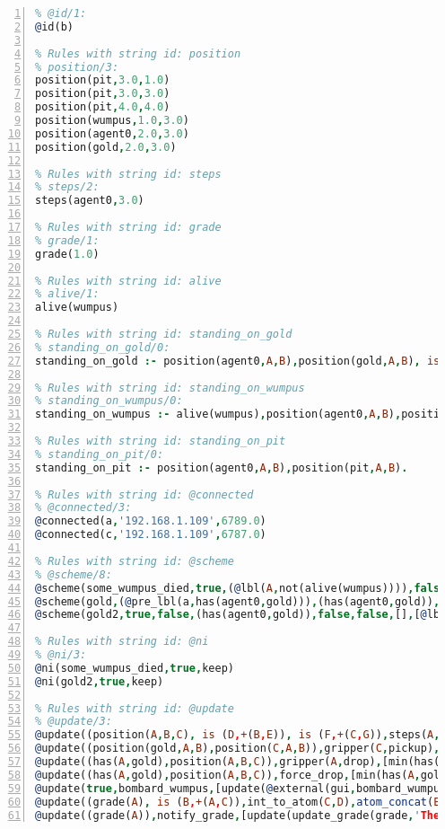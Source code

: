 \documentclass[11pt]{article}\usepackage[utf8]{inputenc}\usepackage{geometry}
\begin{document}
\lstset{breaklines=true}\begin{lstlisting}[language=Prolog, numbers=left]
% Rules with string id: @id
% @id/1:
@id(b)

% Rules with string id: position
% position/3:
position(pit,3.0,1.0)
position(pit,3.0,3.0)
position(pit,4.0,4.0)
position(wumpus,1.0,3.0)
position(agent0,2.0,3.0)
position(gold,2.0,3.0)

% Rules with string id: steps
% steps/2:
steps(agent0,3.0)

% Rules with string id: grade
% grade/1:
grade(1.0)

% Rules with string id: alive
% alive/1:
alive(wumpus)

% Rules with string id: standing_on_gold
% standing_on_gold/0:
standing_on_gold :- position(agent0,A,B),position(gold,A,B), is (C,+(A,B)),>(C,2.0).

% Rules with string id: standing_on_wumpus
% standing_on_wumpus/0:
standing_on_wumpus :- alive(wumpus),position(agent0,A,B),position(wumpus,A,B).

% Rules with string id: standing_on_pit
% standing_on_pit/0:
standing_on_pit :- position(agent0,A,B),position(pit,A,B).

% Rules with string id: @connected
% @connected/3:
@connected(a,'192.168.1.109',6789.0)
@connected(c,'192.168.1.109',6787.0)

% Rules with string id: @scheme
% @scheme/8:
@scheme(some_wumpus_died,true,(@lbl(A,not(alive(wumpus)))),false,false,false,[update(bombard_wumpus)|[]],[])
@scheme(gold,(@pre_lbl(a,has(agent0,gold))),(has(agent0,gold)),false,(@lbl(a,not(has(agent0,gold)))),false,[update(force_drop)|[]],[])
@scheme(gold2,true,false,(has(agent0,gold)),false,false,[],[@lbl(c,update(bombard_wumpus))|[]])

% Rules with string id: @ni
% @ni/3:
@ni(some_wumpus_died,true,keep)
@ni(gold2,true,keep)

% Rules with string id: @update
% @update/3:
@update((position(A,B,C), is (D,+(B,E)), is (F,+(C,G)),steps(A,H), is (I,+(H,1.0))),move(A,E,G),[min(position(A,B,C)),plus(position(A,D,F)),min(steps(A,H)),plus(steps(A,I))|[]])
@update((position(gold,A,B),position(C,A,B)),gripper(C,pickup),[plus(has(C,gold)),min(position(gold,A,B))|[]])
@update((has(A,gold),position(A,B,C)),gripper(A,drop),[min(has(A,gold)),plus(position(gold,B,C))|[]])
@update((has(A,gold),position(A,B,C)),force_drop,[min(has(A,gold)),plus(position(gold,B,C)),update(@external(gui,gripper,D))|[]])
@update(true,bombard_wumpus,[update(@external(gui,bombard_wumpus,A)),min(alive(wumpus))|[]])
@update((grade(A), is (B,+(A,C)),int_to_atom(C,D),atom_concat(E,D,F)),update_grade(G,E,C),[min(grade(A)),plus(grade(B)),update(@external(gui,show_notice(G,F),H))|[]])
@update((grade(A)),notify_grade,[update(update_grade(grade,'The end result: ',A))|[]])

\end{lstlisting}
\clearpage 
\end{document}
